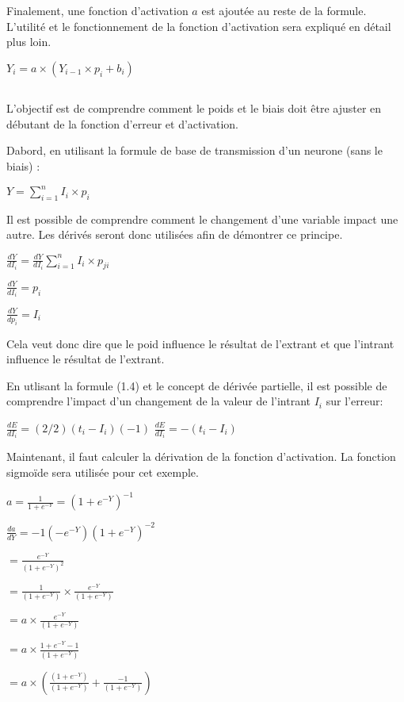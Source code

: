 \documentclass[letterpaper,10pt,french]{sphinxmanual}
\begin{document}
Finalement, une fonction d’activation \(a\) est ajoutée au reste de la formule. L’utilité et le fonctionnement de
la fonction d’activation sera expliqué en détail plus loin.

\(Y_i = a\times(Y_{i-1}\times p_{i} + b_i)\)


\subsection{}
\label{\detokenize{training:back-propagation}}
L’objectif est de comprendre comment le poids et le biais doit être ajuster en débutant de la fonction d’erreur et d’activation.

Dabord, en utilisant la formule de base de transmission d’un neurone (sans le biais) :

\(Y = \sum_{i=1}^{n} I_i \times p_i \)

Il est possible de comprendre comment le changement d’une variable impact une autre. Les dérivés seront
donc utilisées afin de démontrer ce principe.

\(\frac{dY}{dI_i}=\frac{dY}{dI_i}\sum_{i=1}^{n} I_i \times p_{ji} 
\)

\(\frac{dY}{dI_i} = p_i\)

\(\frac{dY}{dp_i} = I_i\)

Cela veut donc dire que le poid influence le résultat de l’extrant et que l’intrant influence
le résultat de l’extrant.

En utlisant la formule (1.4) et le concept de dérivée partielle, il est possible de comprendre
l’impact d’un changement de la valeur de l’intrant \(I_i\) sur l’erreur:

\(\frac{dE}{dI_i} =  (2/2)(t_i - I_i)(-1) \)
\(\frac{dE}{dI_i}= -(t_i-I_i)\)

Maintenant, il faut calculer la dérivation de la fonction d’activation.
La fonction sigmoïde sera utilisée pour cet exemple.

\(a = \frac{1}{1 + e^{-Y}} =(1+e^{-Y})^{-1}\)

\(\frac{da}{dY} = -1 (-e^{-Y})(1+e^{-Y})^{-2} \)

\(= \frac{e^{-Y}}{(1+e^{-Y})^2} \)

\(= \frac{1}{(1+e^{-Y})}\times\frac{e^{-Y}}{(1+e^{-Y})} \)

\(= a \times \frac{e^{-Y}}{(1+e^{-Y})}\)

\(= a \times \frac{1+e^{-Y}-1}{(1+e^{-Y})} \)

\(= a \times (\frac{(1+e^{-Y})}{(1+e^{-Y})} + \frac{-1}{(1+e^{-Y})})\)
\end{document}
